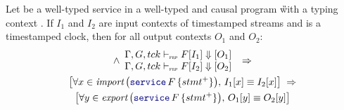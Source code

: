 \begin{theorem}
    \label{thm:semantics:grfrp:theorems:determinism}
    Let  be a well-typed service in a well-typed and causal program \G with a
    typing context \tyCtx. If $I_1$ and $I_2$ are input contexts of timestamped streams and
    \tck is a timestamped clock, then for all output contexts $O_1$ and $O_2$:
    \begin{multline*}
        \wedge \begin{array}{l}
            \serviceDenot{\tck}{I_1}{F}{O_1} \\
            \serviceDenot{\tck}{I_2}{F}{O_2}
        \end{array}
        \; \Rightarrow \\
        \left[\forall x \in \importSet{\service{F}{stmt^+}}, \, I_1[x] \equiv I_2[x]\right]
        \; \Rightarrow \\
        \left[\forall y \in \exportSet{\service{F}{stmt^+}}, \, O_1[y] \equiv O_2[y]\right]
    \end{multline*}
\end{theorem}
